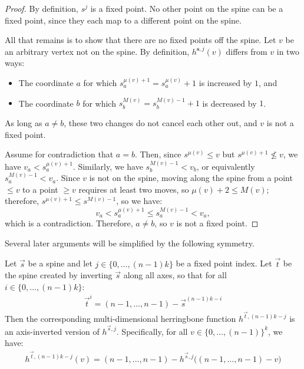 \documentclass[11pt]{article}
\begin{document}
\lemmauniquefixedpoint*
\begin{proof}
    By definition, $s^j$ is a fixed point. No other point on the spine can be a fixed point, since they each map to a different point on the spine.

    All that remains is to show that there are no fixed points off the spine. Let $v$ be an arbitrary vertex not on the spine. By definition, $h^{\mathbf{s}, j}(v)$ differs from $v$ in two ways:
    \begin{itemize}
        \item The coordinate $a$ for which $s^{\mu(v)+1}_a = s^{\mu(v)}_a + 1$ is increased by $1$, and
        \item The coordinate $b$ for which $s^{M(v)}_b = s^{M(v)-1}_b + 1$ is decreased by $1$.
    \end{itemize}
    As long as $a \neq b$, these two changes do not cancel each other out, and $v$ is not a fixed point.
    
    Assume for contradiction that $a = b$. Then, since $s^{\mu(v)} \leq v$ but $s^{\mu(v) + 1} \not \leq v$, we have $v_a < s^{\mu(v)+1}_a$. Similarly, we have $s^{M(v) - 1}_b < v_b$, or equivalently $s^{M(v) - 1}_a < v_a$. Since $v$ is not on the spine, moving along the spine from a point $\leq v$ to a point $\geq v$ requires at least two moves, so $\mu(v) + 2 \leq M(v)$; therefore, $s^{\mu(v)+1} \leq s^{M(v)-1}$, so we have:
    \begin{equation}
        v_a < s^{\mu(v)+1}_a \leq s^{M(v)-1}_a < v_a,
    \end{equation}
    which is a contradiction. Therefore, $a \neq b$, so $v$ is not a fixed point.
\end{proof}

Several later arguments will be simplified by the following symmetry.
\begin{lemma}\label{lem:herringbone-axis-inversion-symmetry}
    Let $\vec{s}$ be a spine and let $j \in \{0, \ldots, (n-1)k\}$ be a fixed point index. Let $\vec{t}$ be the spine created by inverting $\vec{s}$ along all axes, so that for all $i \in \{0, \ldots, (n-1)k\}$:
    \begin{align}
        \vec{t}^i = (n-1, \ldots, n-1) - \vec{s}^{(n-1)k-i}
    \end{align}
    Then the corresponding multi-dimensional herringbone function $h^{\vec{t}, (n-1)k-j}$ is an axis-inverted version of $h^{\vec{s}, j}$. Specifically, for all $v \in \{0, \ldots, (n-1)\}^k$, we have:
    \begin{align}\label{eq:axis-inversion-symmetry-condition}
        h^{\vec{t}, (n-1)k-j}(v) = (n-1, \ldots, n-1) - h^{\vec{s}, j}\bigl( (n-1, \ldots, n-1) - v \bigr)
    \end{align}
\end{lemma}
\end{document}
